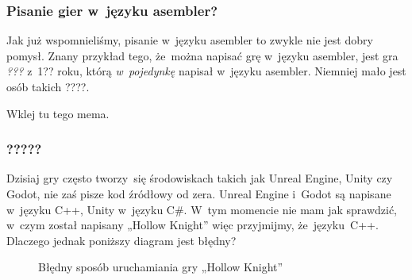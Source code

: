 \documentclass[10pt,t]{beamer}
\begin{document}
\begin{frame}
  \frametitle{Pisanie gier w~języku asembler?}


  Jak już wspomnieliśmy, pisanie w~języku asembler to zwykle nie jest
  dobry pomysł. Znany przykład tego, że~można napisać grę w~języku
  asembler, jest gra \textit{???} z~1?? roku, którą \textit{w~pojedynkę}
  napisał w~języku asembler. Niemniej mało jest osób takich ????.

  Wklej tu tego mema.

\end{frame}






\begin{frame}
  \frametitle{?????}


  Dzisiaj gry często tworzy~się środowiskach takich jak Unreal Engine,
  Unity czy Godot, nie zaś pisze kod źródłowy od zera. Unreal Engine
  i~Godot są napisane w~języku C++, Unity w~języku C\#. W~tym momencie nie
  mam jak sprawdzić, w~czym został napisany „Hollow Knight” więc przyjmijmy,
  że~języku~C++. Dlaczego jednak poniższy diagram jest błędny?





  \begin{figure}


    \caption{Błędny sposób uruchamiania gry „Hollow Knight”}


  \end{figure}

\end{frame}
\end{document}
